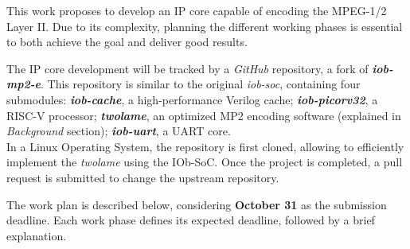 
This work proposes to develop an IP core capable of encoding the MPEG-1/2 Layer II. Due to its complexity, planning the different working phases is essential to both achieve the goal and deliver good results. 

The IP core development will be tracked by a \textit{GitHub} repository, a fork of \textbf{\textit{iob-mp2-e}}. This repository is similar to the original \textit{iob-soc}, containing four submodules: \textbf{\textit{iob-cache}}, a high-performance Verilog cache; \textbf{\textit{iob-picorv32}}, a RISC-V processor; \textbf{\textit{twolame}}, an optimized MP2 encoding software (explained in \textit{Background} section); \textbf{\textit{iob-uart}}, a UART core.\\
In a Linux Operating System, the repository is first cloned, allowing to efficiently implement the \textit{twolame} using the IOb-SoC. Once the project is completed, a pull request is submitted to change the upstream repository.

The work plan is described below, considering \textbf{October 31} as the submission deadline.
Each work phase defines its expected deadline, followed by a brief explanation.


